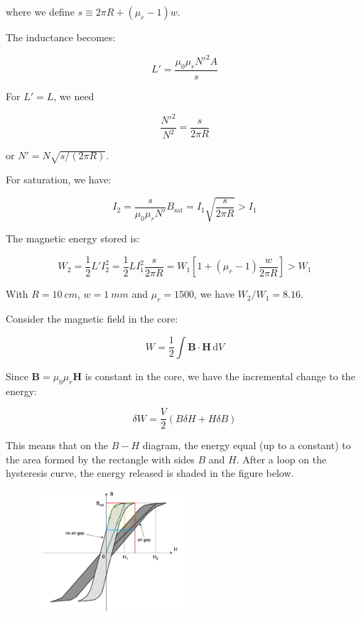 \documentclass[12pt]{article}
\begin{document}
where we define $s \equiv 2\pi R + (\mu_{r} - 1) w$.

The inductance becomes:

\begin{equation}
    L' = \frac{\mu_{0} \mu_{r} N'^{2} A}{s}
\end{equation}

For $L' = L$, we need

\begin{equation}
    \frac{N'^{2}}{N^{2}} = \frac{s}{2\pi R}
\end{equation}

or $N' = N \sqrt{s/(2\pi R)}$.

For saturation, we have:

\begin{equation}
    I_{2} = \frac{s}{\mu_{0} \mu_{r} N'} B_{\text{sat}} = I_{1} \sqrt{\frac{s}{2\pi R}} > I_{1}
\end{equation}

The magnetic energy stored is:

\begin{equation}
    W_{2} = \frac{1}{2} L' I_{2}^{2} = \frac{1}{2} L I_{1}^{2} \frac{s}{2\pi R} = W_{1} \left[ 1 + (\mu_{r} - 1) \frac{w}{2\pi R} \right] > W_{1}
\end{equation}

With $R = \qty{10}{cm}$, $w = \qty{1}{mm}$ and $\mu_{r} = 1500$, we have $W_{2}/W_{1} = 8.16$.

Consider the magnetic field in the core:

\begin{equation}
    W = \frac{1}{2} \int \mathbf{B} \cdot \mathbf{H} \, \mathrm{d}V
\end{equation}

Since $\mathbf{B} = \mu_{0} \mu_{r} \mathbf{H}$ is constant in the core, we have the incremental change to the energy:

\begin{equation}
    \delta W = \frac{V}{2} (B \delta H + H \delta B)
\end{equation}

This means that on the $B-H$ diagram, the energy equal (up to a constant) to the area formed by the rectangle with sides $B$ and $H$. After a loop on the hysteresis curve, the energy released is shaded in the figure below.

\begin{figure}[h]
    \centering
    \includegraphics[width=0.5\textwidth]{../plots/electro_2_8.png}
\end{figure}
\end{document}
